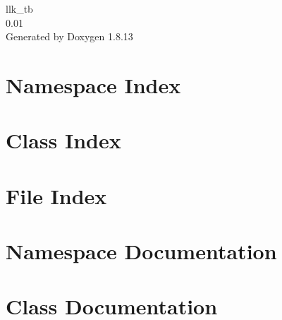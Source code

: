 \documentclass[twoside]{book}
\newcommand{\+}{\discretionary{\mbox{\scriptsize$\hookleftarrow$}}{}{}}
\newcommand{\clearemptydoublepage}{%
  \newpage{\pagestyle{empty}\cleardoublepage}%
}
\begin{document}
\hypersetup{pageanchor=false,
             bookmarksnumbered=true,
             pdfencoding=unicode
            }
\begin{titlepage}
\vspace*{7cm}
\begin{center}%
{\Large llk\+\_\+tb \\[1ex]\large 0.\+01 }\\
\vspace*{1cm}
{\large Generated by Doxygen 1.8.13}\\
\end{center}
\end{titlepage}
\clearemptydoublepage
{}
\tableofcontents
\clearemptydoublepage
{}
\hypersetup{pageanchor=true}

\chapter{Namespace Index}

\chapter{Class Index}

\chapter{File Index}

\chapter{Namespace Documentation}








\chapter{Class Documentation}

















\end{document}
